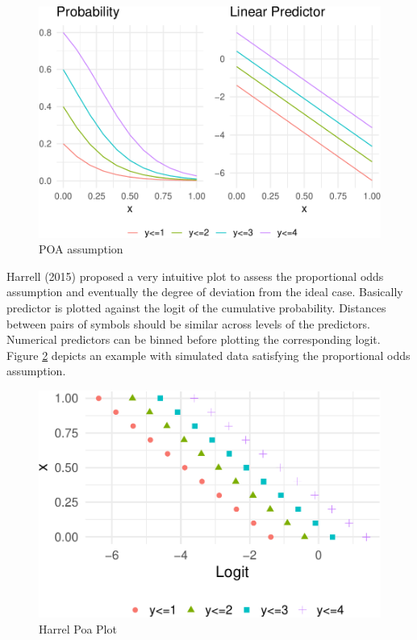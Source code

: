 \documentclass[
  man,floatsintext]{apa6}
\begin{document}
\begin{figure}

{\centering \includegraphics{paper-new_files/figure-latex/poa-plot-example-1} 

}

\caption{POA assumption}\label{fig:poa-plot-example}
\end{figure}

Harrell (2015) proposed a very intuitive plot to assess the proportional odds assumption and eventually the degree of deviation from the ideal case. Basically predictor is plotted against the logit of the cumulative probability. Distances between pairs of symbols should be similar across levels of the predictors. Numerical predictors can be binned before plotting the corresponding logit. Figure \ref{fig:harrel-poa-plot} depicts an example with simulated data satisfying the proportional odds assumption.

\begin{figure}

{\centering \includegraphics{paper-new_files/figure-latex/harrel-poa-plot-1} 

}

\caption{Harrel Poa Plot}\label{fig:harrel-poa-plot}
\end{figure}
\end{document}
